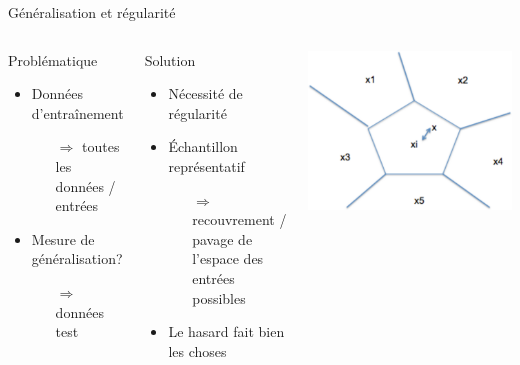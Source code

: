 \documentclass[presentation, aspectratio=169]{beamer}
\begin{document}
\begin{frame}{Généralisation et régularité}
  \begin{columns}
    \begin{block}{Problématique}
      \begin{itemize}
      \item Données d'entraînement
        \begin{itemize}
        \item[$\Longrightarrow$] toutes les données / entrées
        \end{itemize}
      \item Mesure de généralisation?
        \begin{itemize}
        \item[$\Longrightarrow$] données test
        \end{itemize}
      \end{itemize}
    \end{block}
    \begin{block}{Solution}
      \begin{itemize}
      \item Nécessité de régularité
      \item Échantillon représentatif
        \begin{itemize}
        \item[$\Longrightarrow$] recouvrement / pavage de l'espace des
          entrées possibles
        \end{itemize}
      \item Le hasard fait bien les choses
      \end{itemize}
    \end{block}
    \includegraphics[width=\textwidth]{knn}
  \end{columns}
\end{frame}
\end{document}
